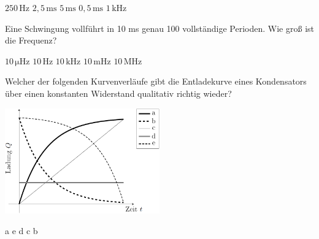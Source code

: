 \documentclass[11pt]{exam}
\begin{document}
\begin{questions}
\begin{choices}
	\choice \(\mathrm{250\,Hz}\)
	\choice \(\mathrm{2,5\,ms}\)
	\choice \(\mathrm{5\,ms}\)
	\choice \(\mathrm{0,5\,ms}\)
	\choice \(\mathrm{1\,kHz}\)
\end{choices}

\vspace{3mm}\question Eine Schwingung vollführt in 10 ms genau 100 vollständige Perioden. Wie groß ist die Frequenz?

\begin{choices}
	\choice \(\mathrm{10\,\mu Hz}\)
	\choice \(\mathrm{10\,Hz}\)
	\choice \(\mathrm{10\,kHz}\)
	\choice \(\mathrm{10\,mHz}\)
	\choice \(\mathrm{10\,MHz}\)
\end{choices}

\vspace{3mm}\question Welcher der folgenden Kurvenverläufe gibt die Entladekurve eines Kondensators über einen konstanten Widerstand qualitativ richtig wieder? 

\includegraphics[width=0.5\textwidth]{../../../questions/D/images/Kondensator-Q-t.png}

\begin{choices}
	\choice a
	\choice e
	\choice d
	\choice c
	\choice b
\end{choices}

\vspace{3mm}\end{questions}
\end{document}
